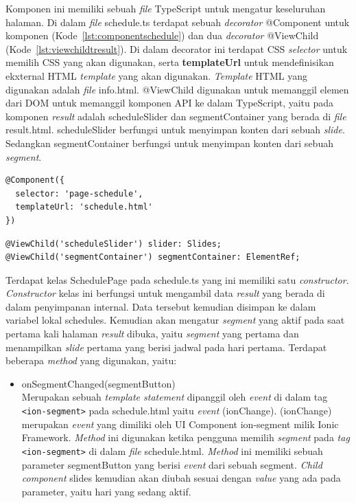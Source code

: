 \begin{enumerate}
\begin{enumerate}
		Komponen ini memiliki sebuah \textit{file} TypeScript untuk mengatur keseluruhan halaman. Di dalam \textit{file} schedule.ts terdapat sebuah \textit{decorator} @Component untuk komponen (Kode~\ref{lst:componentschedule}) dan dua \textit{decorator} @ViewChild (Kode~\ref{lst:viewchildtresult}). Di dalam decorator ini terdapat CSS \textit{selector} untuk memilih CSS yang akan digunakan, serta \textbf{templateUrl} untuk mendefinisikan ekxternal HTML \textit{template} yang akan digunakan. \textit{Template} HTML yang digunakan adalah \textit{file} info.html. @ViewChild digunakan untuk memanggil elemen dari DOM untuk memanggil komponen API ke dalam TypeScript, yaitu pada komponen \textit{result} adalah scheduleSlider dan segmentContainer yang berada di \textit{file} result.html. scheduleSlider berfungsi untuk menyimpan konten dari sebuah \textit{slide}. Sedangkan segmentContainer berfungsi untuk menyimpan konten dari sebuah \textit{segment}.

\begin{lstlisting}[label={lst:componentschedule}, caption=@Component pada schedule.ts]
@Component({
  selector: 'page-schedule',
  templateUrl: 'schedule.html'
})
\end{lstlisting}

\begin{lstlisting}[label={lst:viewchildtresult}, caption=@ViewChild pada schedule.ts]
@ViewChild('scheduleSlider') slider: Slides;
@ViewChild('segmentContainer') segmentContainer: ElementRef;
\end{lstlisting} 

	Terdapat kelas SchedulePage pada schedule.ts yang ini memiliki satu \textit{constructor}. \textit{Constructor} kelas ini berfungsi untuk mengambil data \textit{result} yang berada di dalam penyimpanan internal. Data tersebut kemudian disimpan ke dalam variabel lokal schedules. Kemudian akan mengatur \textit{segment} yang aktif pada saat pertama kali halaman \textit{result} dibuka, yaitu \textit{segment} yang pertama dan menampilkan \textit{slide} pertama yang berisi jadwal pada hari pertama. Terdapat beberapa \textit{method} yang digunakan, yaitu:
	
	\begin{itemize}
		\item onSegmentChanged(segmentButton) \\
		Merupakan sebuah \textit{template statement} dipanggil oleh \textit{event} di dalam tag \texttt{<ion-segment>} pada schedule.html yaitu \textit{event} (ionChange). (ionChange) merupakan \textit{event} yang dimiliki oleh UI Component ion-segment milik Ionic Framework. \textit{Method} ini digunakan ketika pengguna memilih \textit{segment} pada \textit{tag} \texttt{<ion-segment>} di dalam \textit{file} schedule.html. \textit{Method} ini memiliki sebuah parameter segmentButton yang berisi \textit{event} dari sebuah segment. \textit{Child component} slides kemudian akan diubah sesuai dengan \textit{value} yang ada pada parameter, yaitu hari yang sedang aktif. 


\end{itemize}
\end{enumerate}
\end{enumerate}
